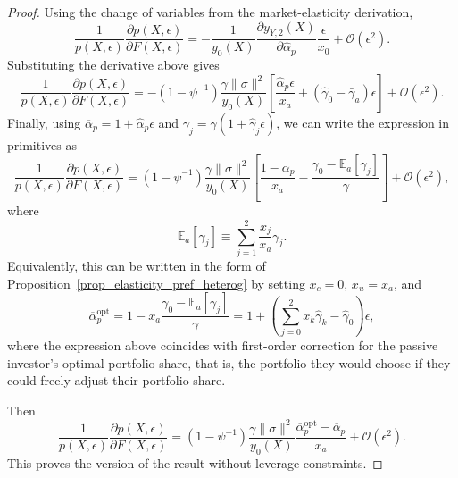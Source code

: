 \begin{proof}
Using the change of variables from the market-elasticity derivation,
\begin{equation}
    \frac{1}{p(X,\epsilon)}\frac{\partial p(X,\epsilon)}{\partial F(X,\epsilon)}
    = -\frac{1}{y_0(X)}
    \frac{\partial y_{Y,2}(X)}{\partial \hat{\alpha}_p}
    \frac{\epsilon}{x_0}
    +\mathcal{O}(\epsilon^2).
\end{equation}
Substituting the derivative above gives
\begin{equation}
    \frac{1}{p(X,\epsilon)}\frac{\partial p(X,\epsilon)}{\partial F(X,\epsilon)}
    = -(1-\psi^{-1})\frac{\gamma\|\sigma\|^2}{y_0(X)}
    \left[\frac{\hat{\alpha}_p\epsilon}{x_a}+(\hat{\gamma}_0-\bar{\gamma}_a)\epsilon\right]
    +\mathcal{O}(\epsilon^2).
\end{equation}
Finally, using $\overline{\alpha}_p=1+\hat{\alpha}_p\epsilon$ and $\gamma_j=\gamma(1+\hat{\gamma}_j\epsilon)$, we can write the expression in primitives as
\begin{equation}
    \frac{1}{p(X,\epsilon)}\frac{\partial p(X,\epsilon)}{\partial F(X,\epsilon)}
    = (1-\psi^{-1})\frac{\gamma\|\sigma\|^2}{y_0(X)}
    \left[
        \frac{1-\overline{\alpha}_p}{x_a}
        -\frac{\gamma_0-\mathbb{E}_a[\gamma_j]}{\gamma}
    \right]
    +\mathcal{O}(\epsilon^2),
\end{equation}
where
\begin{equation}
    \mathbb{E}_a[\gamma_j]\equiv \sum_{j=1}^2 \frac{x_j}{x_a}\gamma_j.
\end{equation}
Equivalently, this can be written in the form of Proposition~\ref{prop_elasticity_pref_heterog} by setting $x_c=0$, $x_u=x_a$, and
\begin{equation}
    \overline{\alpha}_{p}^{\mathrm{opt}}
    =1-x_a\frac{\gamma_0-\mathbb{E}_a[\gamma_j]}{\gamma} = 1 + \left( \sum_{j=0}^2 x_k \hat{\gamma}_k  - \hat{\gamma}_0 \right) \epsilon,
\end{equation}
where the expression above coincides with first-order correction for the passive investor's optimal portfolio share, that is, the portfolio they would choose if they could freely adjust their portfolio share.

Then
\begin{equation}
    \frac{1}{p(X,\epsilon)}\frac{\partial p(X,\epsilon)}{\partial F(X,\epsilon)}
    = (1-\psi^{-1})\frac{\gamma\|\sigma\|^2}{y_0(X)}
    \frac{\overline{\alpha}_{p}^{\mathrm{opt}}-\overline{\alpha}_p}{x_a}
    +\mathcal{O}(\epsilon^2).
\end{equation}
This proves the version of the result without leverage constraints.


\end{proof}
